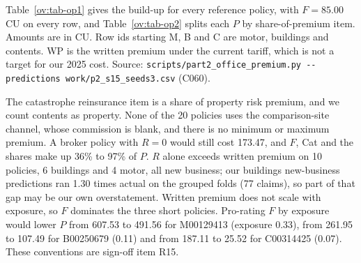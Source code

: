 \documentclass{rapport}
\begin{document}
Table~\ref{ov:tab-op1} gives the build-up for every reference policy, with $F = 85.00$ CU on every row, and
Table~\ref{ov:tab-op2} splits each $P$ by share-of-premium item. Amounts are in CU. Row ids starting M, B and C are
motor, buildings and contents. WP is the written premium under the current tariff, which is not a target for our 2025
cost. Source: \texttt{scripts/part2\_office\_premium.py -{}-predictions work/p2\_s15\_seeds3.csv} (C060).

The catastrophe reinsurance item is a share of property risk premium, and we count contents as property. None of the
20 policies uses the comparison-site channel, whose commission is blank, and there is no minimum or maximum premium. A
broker policy with $R = 0$ would still cost 173.47, and $F$, Cat and the shares make up 36\% to 97\% of $P$. $R$ alone
exceeds written premium on 10 policies, 6 buildings and 4 motor, all new business; our buildings new-business
predictions ran 1.30 times actual on the grouped folds (77 claims), so part of that gap may be our own overstatement.
Written premium does not scale with exposure, so $F$ dominates the three short policies. Pro-rating $F$ by exposure
would lower $P$ from 607.53 to 491.56 for M00129413 (exposure 0.33), from 261.95 to 107.49 for B00250679 (0.11) and
from 187.11 to 25.52 for C00314425 (0.07). These conventions are sign-off item R15.
\end{document}
